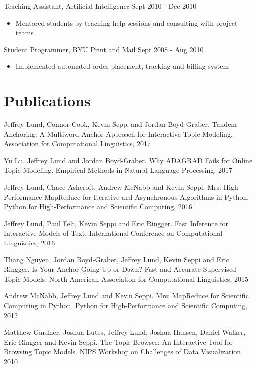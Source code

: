 \documentclass[margin]{res}
\begin{document}
\begin{resume}
Teaching Assistant, Artificial Intelligence \hfill Sept 2010 - Dec 2010
\begin{itemize} \itemsep -2pt
\item Mentored students by teaching help sessions and consulting with project teams
\end{itemize}

Student Programmer, BYU Print and Mail \hfill Sept 2008 - Aug 2010
\begin{itemize} \itemsep -2pt
\item Implemented automated order placement, tracking and billing system
\end{itemize}


\section{Publications}


Jeffrey Lund, Connor Cook, Kevin Seppi and Jordan Boyd-Graber. Tandem Anchoring: A Multiword Anchor Approach for Interactive Topic Modeling. Association for Computational Linguistics, 2017

Yu Lu, Jeffrey Lund and Jordan Boyd-Graber. Why ADAGRAD Fails for Online Topic Modeling. Empirical Methods in Natural Language Processing, 2017

Jeffrey Lund, Chace Ashcroft, Andrew McNabb and Kevin Seppi. Mrs: High Performance MapReduce for Iterative and Asynchronous Algorithms in Python. Python for High-Performance and Scientific Computing, 2016

Jeffrey Lund, Paul Felt, Kevin Seppi and Eric Ringger. Fast Inference for Interactive Models of Text. International Conference on Computational Linguistics, 2016

Thang Nguyen, Jordan Boyd-Graber, Jeffrey Lund, Kevin Seppi and Eric Ringger. Is Your Anchor Going Up or Down? Fast and Accurate Supervised Topic Models. North American Association for Computational Linguistics, 2015

Andrew McNabb, Jeffrey Lund and Kevin Seppi. Mrs: MapReduce for Scientific Computing in Python. Python for High-Performance and Scientific Computing, 2012

Matthew Gardner, Joshua Lutes, Jeffrey Lund, Joshua Hansen, Daniel Walker, Eric Ringger and Kevin Seppi. The Topic Browser: An Interactive Tool for Browsing Topic Models. NIPS Workshop on Challenges of Data Visualization, 2010

\end{resume}
\end{document}
